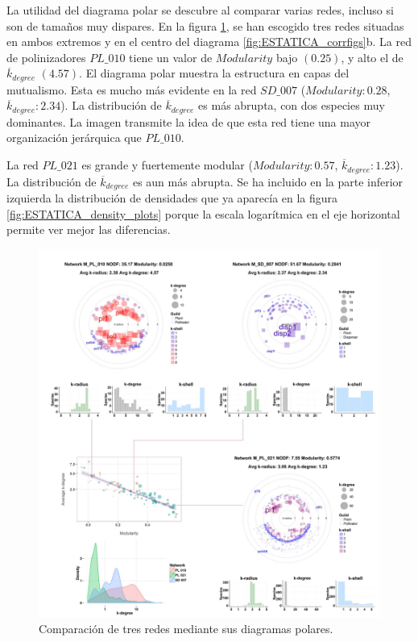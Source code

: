La utilidad del diagrama polar se descubre al comparar varias redes, incluso si son de tamaños muy dispares. En la figura \ref{fig:VIS_Modvskdegree3}, se han escogido tres redes situadas en ambos extremos y en el centro del diagrama \ref{fig:ESTATICA_corrfigs}b. La red de polinizadores $PL\_010$  tiene un valor de $Modularity$ bajo $(0.25)$, y alto el de $\overline {k}_{degree}$ $(4.57)$. El diagrama polar muestra la estructura en capas del mutualismo. Esta es mucho más evidente en la red $SD\_007$ ($Modularity: 0.28$, $\overline {k}_{degree}: 2.34$). La distribución de $\overline {k}_{degree}$ es más abrupta, con dos especies muy dominantes. La imagen transmite la idea de que esta red tiene una mayor organización jerárquica que $PL\_010$.

La red $PL\_021$ es grande y fuertemente modular ($Modularity: 0.57$, $\overline {k}_{degree}: 1.23$). La distribución de $\overline {k}_{degree}$ es aun más abrupta. Se ha incluido en la parte inferior izquierda la distribución de densidades que ya aparecía en la figura \ref{fig:ESTATICA_density_plots} porque la escala logarítmica en el eje horizontal permite ver mejor las diferencias.

\begin{figure}[h!]
\centering
\includegraphics[scale=0.75]{Figures/VIS_Modvskdegree3.PDF}
\caption[PolarExample]{Comparación de tres redes mediante sus diagramas polares.}
\label{fig:VIS_Modvskdegree3}
\end{figure}

